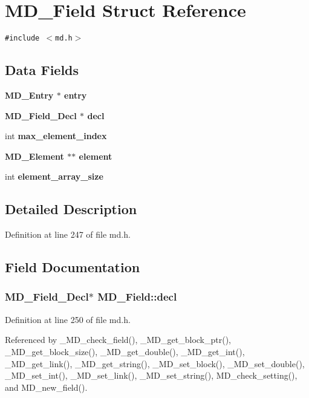 \section{MD\_\-Field Struct Reference}
\label{structMD__Field}
{\tt \#include $<$md.h$>$}

\subsection*{Data Fields}
\begin{CompactItemize}
\item 
\bf{MD\_\-Entry} $\ast$ \bf{entry}
\item 
\bf{MD\_\-Field\_\-Decl} $\ast$ \bf{decl}
\item 
int \bf{max\_\-element\_\-index}
\item 
\bf{MD\_\-Element} $\ast$$\ast$ \bf{element}
\item 
int \bf{element\_\-array\_\-size}
\end{CompactItemize}


\subsection{Detailed Description}




Definition at line 247 of file md.h.

\subsection{Field Documentation}
\subsubsection{\setlength{\rightskip}{0pt plus 5cm}\bf{MD\_\-Field\_\-Decl}$\ast$ \bf{MD\_\-Field::decl}}\label{structMD__Field_507895b2c7e647afd56840a2a0cd2136}




Definition at line 250 of file md.h.

Referenced by \_\-MD\_\-check\_\-field(), \_\-MD\_\-get\_\-block\_\-ptr(), \_\-MD\_\-get\_\-block\_\-size(), \_\-MD\_\-get\_\-double(), \_\-MD\_\-get\_\-int(), \_\-MD\_\-get\_\-link(), \_\-MD\_\-get\_\-string(), \_\-MD\_\-set\_\-block(), \_\-MD\_\-set\_\-double(), \_\-MD\_\-set\_\-int(), \_\-MD\_\-set\_\-link(), \_\-MD\_\-set\_\-string(), MD\_\-check\_\-setting(), and MD\_\-new\_\-field().
